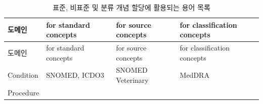 \documentclass[10.5pt]{book}
\theoremstyle{definition}
\theoremstyle{definition}
\theoremstyle{definition}
\theoremstyle{remark}
\begin{document}
\begin{longtable}[]{@{}llll@{}}
\caption{\label{tab:vocabList} 표준, 비표준 및 분류 개념 할당에 활용되는
용어 목록}\tabularnewline
\toprule
\begin{minipage}[b]{0.12\columnwidth}\raggedright\strut
도메인\strut
\end{minipage} & \begin{minipage}[b]{0.21\columnwidth}\raggedright\strut
for standard concepts\strut
\end{minipage} & \begin{minipage}[b]{0.21\columnwidth}\raggedright\strut
for source concepts\strut
\end{minipage} & \begin{minipage}[b]{0.18\columnwidth}\raggedright\strut
for classification concepts\strut
\end{minipage}\tabularnewline
\midrule
\endfirsthead
\toprule
\begin{minipage}[b]{0.12\columnwidth}\raggedright\strut
도메인\strut
\end{minipage} & \begin{minipage}[b]{0.21\columnwidth}\raggedright\strut
for standard concepts\strut
\end{minipage} & \begin{minipage}[b]{0.21\columnwidth}\raggedright\strut
for source concepts\strut
\end{minipage} & \begin{minipage}[b]{0.18\columnwidth}\raggedright\strut
for classification concepts\strut
\end{minipage}\tabularnewline
\midrule
\endhead
\begin{minipage}[t]{0.12\columnwidth}\raggedright\strut
Condition\strut
\end{minipage} & \begin{minipage}[t]{0.21\columnwidth}\raggedright\strut
SNOMED, ICDO3\strut
\end{minipage} & \begin{minipage}[t]{0.21\columnwidth}\raggedright\strut
SNOMED Veterinary\strut
\end{minipage} & \begin{minipage}[t]{0.18\columnwidth}\raggedright\strut
MedDRA\strut
\end{minipage}\tabularnewline
\begin{minipage}[t]{0.12\columnwidth}\raggedright\strut
Procedure\strut
\end{minipage} & \begin{minipage}[t]{0.21\columnwidth}\raggedright\strut

\end{minipage}
\end{longtable}
\end{document}
